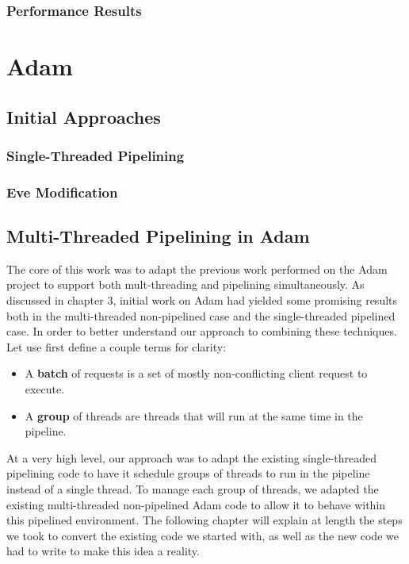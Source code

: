 \documentclass[11pt, oneside]{report}
\begin{document}
\subsection{Performance Results}

\chapter{Adam}


\section{Initial Approaches}

\subsection{Single-Threaded Pipelining}

\subsection{Eve Modification}

\section{Multi-Threaded Pipelining in Adam}

The core of this work was to adapt the previous work performed on the Adam project to support both mult-threading and pipelining simultaneously. As discussed in chapter 3, initial work on Adam had yielded some promising results both in the multi-threaded non-pipelined case and the single-threaded pipelined case. In order to better understand our approach to combining these techniques. Let use first define a couple terms for clarity:
\begin{itemize}
\item A \textbf{batch} of requests is a set of mostly non-conflicting client request to execute.
\item A \textbf{group} of threads are threads that will run at the same time in the pipeline.
\end{itemize}

At a very high level, our approach was to adapt the existing single-threaded pipelining code to have it schedule groups of threads to run in the pipeline instead of a single thread. To manage each group of threads, we adapted the existing multi-threaded non-pipelined Adam code to allow it to behave within this pipelined environment. The following chapter will explain at length the steps we took to convert the existing code we started with, as well as the new code we had to write to make this idea a reality.
\end{document}
